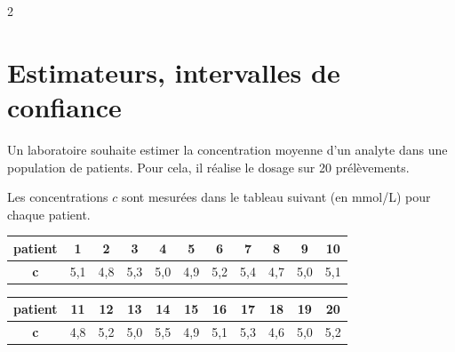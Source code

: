 \documentclass[10pt,a4paper]{article}
\begin{document}
\begin{multicols}{2}

\section{Estimateurs, intervalles de confiance}

\begin{exo}[][ccf]
    Un laboratoire souhaite estimer la concentration moyenne d'un analyte dans une population de patients. Pour cela, il réalise le dosage sur 20 prélèvements.

    Les concentrations \(c\) sont mesurées dans le tableau suivant (en mmol/L) pour chaque patient.

    \begin{center}
\setlength{\tabcolsep}{0.3em}
\begin{tabular}{|c|*{10}{c|}}
    \hline
    \textbf{patient} 
    & 1 & 2 & 3 & 4 & 5 & 6 & 7 & 8 & 9 & 10 \\
    \hline
    \textbf{c}
    & 5,1 & 4,8 & 5,3 & 5,0 & 4,9 & 5,2 & 5,4 & 4,7 & 5,0 & 5,1 \\
    \hline
\end{tabular}

\vspace{0.4cm}

\begin{tabular}{|c|*{10}{c|}}
    \hline
    \textbf{patient} 
    & 11 & 12 & 13 & 14 & 15 & 16 & 17 & 18 & 19 & 20 \\
    \hline
    \textbf{c}
    & 4,8 & 5,2 & 5,0 & 5,5 & 4,9 & 5,1 & 5,3 & 4,6 & 5,0 & 5,2 \\
    \hline
\end{tabular}
\end{center}


\end{exo}
\end{multicols}
\end{document}
